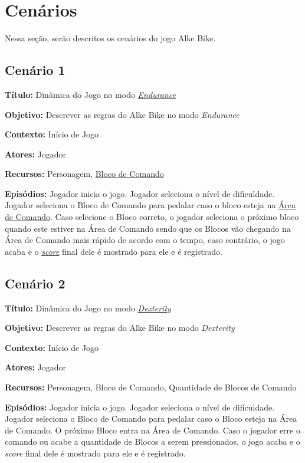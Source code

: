 \section{Cenários}

Nessa seção, serão descritos os \hypertarget{cenarios}{cenários} do jogo Alke Bike.

\subsection{Cenário 1}

\textbf{Título:} Dinâmica do Jogo no modo \hyperlink{endurance}{\textit{Endurance}}

\textbf{Objetivo:} Descrever as regras do Alke Bike no modo \textit{Endurance}

\textbf{Contexto:} Início de Jogo

\textbf{Atores:} Jogador

\textbf{Recursos:} Personagem, \hyperlink{blocoDeComando}{Bloco de Comando}

\textbf{Episódios:} Jogador inicia o jogo. Jogador seleciona o nível de dificuldade. Jogador seleciona o Bloco de Comando para pedalar caso o bloco esteja na \hyperlink{areaDeComando}{Área de Comando}. Caso selecione o Bloco correto, o jogador seleciona o próximo bloco quando este estiver na Área de Comando sendo que os Blocos vão chegando na Área de Comando mais rápido de acordo com o tempo, caso contrário, o jogo acaba e o \hyperlink{score}{\textit{score}} final dele é mostrado para ele e é registrado.

\subsection{Cenário 2}

\textbf{Título:} Dinâmica do Jogo no modo \hyperlink{dexterity}{\textit{Dexterity}}

\textbf{Objetivo:} Descrever as regras do Alke Bike no modo \textit{Dexterity}

\textbf{Contexto:} Início de Jogo

\textbf{Atores:} Jogador

\textbf{Recursos:} Personagem, Bloco de Comando, Quantidade de Blocos de Comando

\textbf{Episódios:} Jogador inicia o jogo. Jogador seleciona o nível de dificuldade. Jogador seleciona o Bloco de Comando para pedalar caso o Bloco esteja na Área de Comando. O próximo Bloco entra na Área de Comando. Caso o jogador erre o comando ou acabe a quantidade de Blocos a serem pressionados, o jogo acaba e o \textit{score} final dele é mostrado para ele e é registrado.

